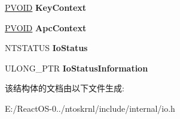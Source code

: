 \begin{DoxyCompactItemize}
\begin{tabbing}
\end{tabbing}\item 
\mbox{\label{struct___i_o_p___m_i_n_i___c_o_m_p_l_e_t_i_o_n___p_a_c_k_e_t_ade3c119924b9242566c180a54fb9b7ee}} 
\hyperlink{interfacevoid}{P\+V\+O\+ID} {\bfseries Key\+Context}
\item 
\mbox{\label{struct___i_o_p___m_i_n_i___c_o_m_p_l_e_t_i_o_n___p_a_c_k_e_t_a8a9e0781edfa2c0f16b3002b792d6a8b}} 
\hyperlink{interfacevoid}{P\+V\+O\+ID} {\bfseries Apc\+Context}
\item 
\mbox{\label{struct___i_o_p___m_i_n_i___c_o_m_p_l_e_t_i_o_n___p_a_c_k_e_t_ac0472de1847b3cda8c56feccf69573d0}} 
N\+T\+S\+T\+A\+T\+US {\bfseries Io\+Status}
\item 
\mbox{\label{struct___i_o_p___m_i_n_i___c_o_m_p_l_e_t_i_o_n___p_a_c_k_e_t_a8d21415f0ca4c4ee3dec6e0d7d1b3be4}} 
U\+L\+O\+N\+G\+\_\+\+P\+TR {\bfseries Io\+Status\+Information}
\end{DoxyCompactItemize}


该结构体的文档由以下文件生成\+:\begin{DoxyCompactItemize}
\item 
E\+:/\+React\+O\+S-\/0../ntoskrnl/include/internal/io.\+h\end{DoxyCompactItemize}
